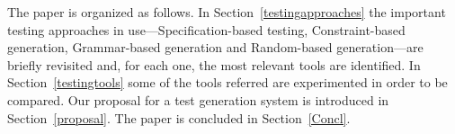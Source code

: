 \documentclass[10pt, conference, compsocconf]{IEEEtran}
\begin{document}
%

The paper is organized as follows.
In Section~\ref{testingapproaches} the important testing approaches in
use---Specification-based testing, Constraint-based generation,
Grammar-based generation and Random-based generation---are briefly
revisited and, for each one,  the most relevant
tools are identified.
In Section~\ref{testingtools} some of the tools referred are
experimented in order to be compared.
Our proposal for a test generation system is introduced in
Section~\ref{proposal}.
The paper is concluded in Section~\ref{Concl}.
\end{document}
